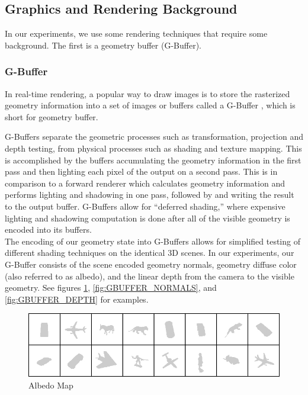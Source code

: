 \documentclass[10pt,twocolumn,letterpaper]{article}
\begin{document}
\subsection{Graphics and Rendering Background}

In our experiments, we use some rendering techniques that require some background.  The first is a geometry buffer (G-Buffer).
\subsubsection{G-Buffer}

In real-time rendering, a popular way to draw images is to store the rasterized geometry information into a set of images or buffers called a G-Buffer \cite{Saito:1990:CRS:97879.97901}, which is short for geometry buffer. 

G-Buffers separate the geometric processes such as transformation, projection and depth testing, from physical processes such as shading and texture mapping.  This is accomplished by the buffers accumulating the geometry information in the first pass and then lighting each pixel of the output on a second pass.  This is in comparison to a forward renderer which calculates geometry information and performs lighting and shadowing in one pass, followed by and writing the result to the output buffer.  
G-Buffers allow for ``deferred shading,'' where expensive lighting and shadowing computation is done after all of the visible geometry is encoded into its buffers.\\

The encoding of our geometry state into G-Buffers allows for simplified testing of different shading techniques on the identical 3D scenes.
In our experiments, our G-Buffer consists of the scene encoded geometry normals, geometry diffuse color (also referred to as albedo), and the linear depth from the camera to the visible geometry.  See figures \ref{fig:GBUFFER_ALBEDO}, \ref{fig:GBUFFER_NORMALS}, and \ref{fig:GBUFFER_DEPTH} for examples.
\begin{figure}[h!]
\centering
\includegraphics[width=0.8\columnwidth]{./assets/synth_albedo.jpg}
\caption{Albedo Map}
\label{fig:GBUFFER_ALBEDO}
\end{figure}
\end{document}
